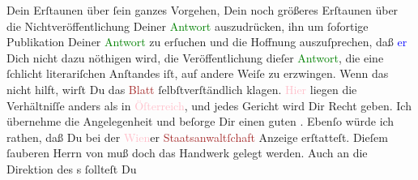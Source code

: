                Dein Erſtaunen über ſein ganzes Vorgehen, Dein noch größeres Erſtaunen über  die Nichtveröffentlichung Deiner \textcolor{green}{Antwort}{}\ledrightnote{{$\rightarrow$}\textcolor{green}{Das angebliche Telegramm Arthur Schnitzlers}} auszudrücken, ihn um ſofortige
               Publikation Deiner \textcolor{green}{Antwort}{}\ledrightnote{{$\rightarrow$}\textcolor{green}{Das angebliche Telegramm Arthur Schnitzlers}} zu
               erſuchen und die Hoffnung auszuſprechen, daß {\pb}\textcolor{blue}{er}{}\ledrightnote{{$\rightarrow$}\textcolor{blue}{Karl Strecker}} Dich nicht dazu nöthigen
               wird, die Veröffentlichung dieſer \textcolor{green}{Antwort}{}\ledrightnote{{$\rightarrow$}\textcolor{green}{Das angebliche Telegramm Arthur Schnitzlers}}, die eine ſchlicht literariſchen Anſtandes iſt, auf andere Weiſe zu
               erzwingen. Wenn das nicht hilft, wirſt Du das \textcolor{brown}{Blatt}{}\ledrightnote{{$\rightarrow$}\textcolor{brown}{Tägliche Rundschau}} ſelbſtverſtändlich klagen. \textcolor{pink}{Hier}{}\ledrightnote{{$\rightarrow$}\textcolor{pink}{Deutschland}} liegen die Verhältniſſe anders als in
                  \textcolor{pink}{Öſterreich}{}\ledrightnote{\textcolor{pink}{Österreich}}, und jedes Gericht wird Dir Recht
               geben. Ich übernehme die Angelegenheit und beſorge Dir einen guten \label{K_L03205-12v}\label{K_L03205-12h}. Ebenſo würde ich rathen, daß Du bei der \textcolor{pink}{Wien}{}\ledrightnote{\textcolor{pink}{Wien}}er \textcolor{brown}{Staatsanwaltſchaft}{}\ledrightnote{\textcolor{brown}{Staatsanwaltschaft}} Anzeige erſtatteſt. Dieſem ſauberen Herrn von \label{K_L03205-5v}\label{K_L03205-5h} muß
               doch das Handwerk gelegt werden. Auch an die {\pb}Direktion des \label{K_L03205-6v}\label{K_L03205-6h}s ſollteſt Du
